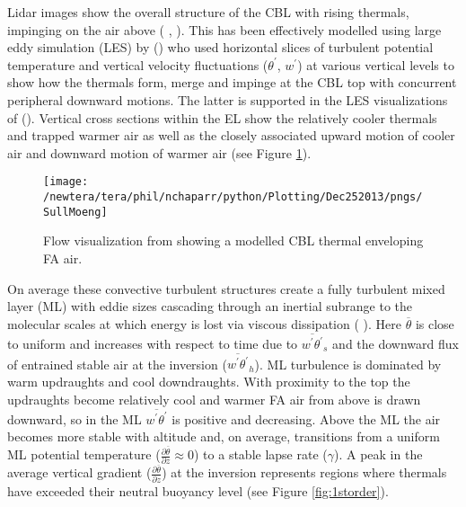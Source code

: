 Lidar images show the overall structure of the \acs{CBL} with rising thermals, impinging on the air above (\citeauthor{CrumStullEl} \citeyear{CrumStullEl}, \citeauthor{Traum11} \citeyear{Traum11}).  This has been effectively modelled using large eddy simulation (\acs{LES}) by \citeauthor{SchmidtSchu} (\citeyear{SchmidtSchu}) who used horizontal slices of turbulent potential temperature and vertical velocity fluctuations ($\theta^{'}$, $w^{'}$) at various vertical levels to show how the thermals form, merge and impinge at the \acs{CBL} top with concurrent peripheral downward motions.  The latter is supported in the \acs{LES} visualizations of \citeauthor{SullMoengStev} (\citeyear{SullMoengStev}).  Vertical cross sections within the \acs{EL} show the relatively cooler thermals and trapped warmer air as well as the closely associated upward motion of cooler air and downward motion of warmer air (see Figure \ref{fig:SullMoeng}).\\ 

\begin{figure}[htbp]
    \centering
    \texttt{[image: /newtera/tera/phil/nchaparr/python/Plotting/Dec252013/pngs/SullMoeng]}
    \caption{Flow visualization from \citeauthor{SullMoengStev} \citeyear{SullMoengStev} showing a modelled \acs{CBL} thermal enveloping \acs{FA} air.}
    \label{fig:SullMoeng}   %
\end{figure}


On average these convective turbulent structures create a fully turbulent mixed layer (\acs{ML}) with eddie sizes cascading through an inertial subrange to the molecular scales at which energy is lost via viscous dissipation (\citeauthor{Stull-BLMetIntro} \citeyear{Stull-BLMetIntro}).  Here $\overline{\theta}$ is close to uniform and increases with respect to time due to $\overline{w^{'}\theta^{'}}_{s}$ and the downward flux of entrained stable air at the inversion ($\overline{w^{'}\theta^{'}}_{h}$).  \acs{ML} turbulence is dominated by warm updraughts and cool downdraughts.  With proximity to the top the updraughts become relatively cool and warmer \acs{FA} air from above is drawn downward, so in the \acs{ML} $\overline{w^{'}\theta^{'}}$ is positive and decreasing.  Above the \acs{ML} the air becomes more stable with altitude and, on average, transitions from a uniform \acs{ML} potential temperature ($\frac{\partial \overline{\theta}}{\partial z} \approx 0$) to a stable lapse rate ($\gamma$).  A peak in the average vertical gradient ($\frac{\partial \overline{\theta}}{\partial z}$) at the inversion represents regions where thermals have exceeded their neutral buoyancy level (see Figure \ref{fig:1storder}).\\

